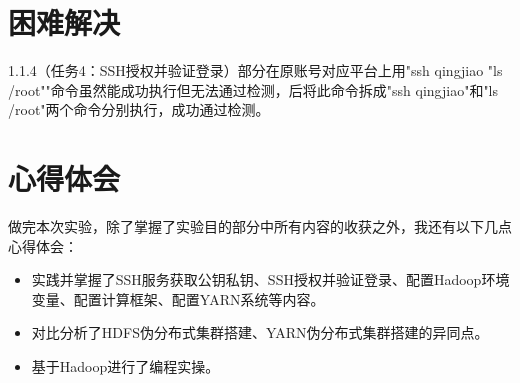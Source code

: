 \documentclass {article}
\begin{document}
	\section{困难解决}
		1.1.4（任务4：SSH授权并验证登录）部分在原账号对应平台上用"ssh qingjiao "ls /root""命令虽然能成功执行但无法通过检测，后将此命令拆成"ssh qingjiao"和"ls /root"两个命令分别执行，成功通过检测。
	
	\section{心得体会}
		做完本次实验，除了掌握了实验目的部分中所有内容的收获之外，我还有以下几点心得体会：
		\begin{itemize}
			\item 实践并掌握了SSH服务获取公钥私钥、SSH授权并验证登录、配置Hadoop环境变量、配置计算框架、配置YARN系统等内容。
			\item 对比分析了HDFS伪分布式集群搭建、YARN伪分布式集群搭建的异同点。
			\item 基于Hadoop进行了编程实操。
		\end{itemize}
\end{document}

